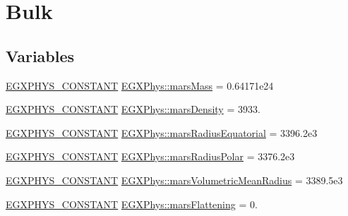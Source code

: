 \hypertarget{group___e_g_x_phys-_constants-_astrophysics-_solar_system-_mars-_bulk}{}\section{Bulk}
\label{group___e_g_x_phys-_constants-_astrophysics-_solar_system-_mars-_bulk}
\subsection*{Variables}
\begin{DoxyCompactItemize}
\item 
\mbox{\hyperlink{group___e_g_x_phys-_constants-_macros_ga76980d288494ce1714c9ac68a95ba702}{E\+G\+X\+P\+H\+Y\+S\+\_\+\+C\+O\+N\+S\+T\+A\+NT}} \mbox{\hyperlink{group___e_g_x_phys-_constants-_astrophysics-_solar_system-_mars-_bulk_gacbdde45535f9e28a8a5d027480c9c6c8}{E\+G\+X\+Phys\+::mars\+Mass}} = 0.\+64171e24
\item 
\mbox{\hyperlink{group___e_g_x_phys-_constants-_macros_ga76980d288494ce1714c9ac68a95ba702}{E\+G\+X\+P\+H\+Y\+S\+\_\+\+C\+O\+N\+S\+T\+A\+NT}} \mbox{\hyperlink{group___e_g_x_phys-_constants-_astrophysics-_solar_system-_mars-_bulk_ga6871edfd0369c53e4d01b0cef426f095}{E\+G\+X\+Phys\+::mars\+Density}} = 3933.
\item 
\mbox{\hyperlink{group___e_g_x_phys-_constants-_macros_ga76980d288494ce1714c9ac68a95ba702}{E\+G\+X\+P\+H\+Y\+S\+\_\+\+C\+O\+N\+S\+T\+A\+NT}} \mbox{\hyperlink{group___e_g_x_phys-_constants-_astrophysics-_solar_system-_mars-_bulk_gad164808b78372ba39b4e1db1daa53a61}{E\+G\+X\+Phys\+::mars\+Radius\+Equatorial}} = 3396.\+2e3
\item 
\mbox{\hyperlink{group___e_g_x_phys-_constants-_macros_ga76980d288494ce1714c9ac68a95ba702}{E\+G\+X\+P\+H\+Y\+S\+\_\+\+C\+O\+N\+S\+T\+A\+NT}} \mbox{\hyperlink{group___e_g_x_phys-_constants-_astrophysics-_solar_system-_mars-_bulk_ga9babf4f526022d2bcd3d434453401ff5}{E\+G\+X\+Phys\+::mars\+Radius\+Polar}} = 3376.\+2e3
\item 
\mbox{\hyperlink{group___e_g_x_phys-_constants-_macros_ga76980d288494ce1714c9ac68a95ba702}{E\+G\+X\+P\+H\+Y\+S\+\_\+\+C\+O\+N\+S\+T\+A\+NT}} \mbox{\hyperlink{group___e_g_x_phys-_constants-_astrophysics-_solar_system-_mars-_bulk_ga89463b1a65363c3f458c8427a3d5ca90}{E\+G\+X\+Phys\+::mars\+Volumetric\+Mean\+Radius}} = 3389.\+5e3
\item 
\mbox{\hyperlink{group___e_g_x_phys-_constants-_macros_ga76980d288494ce1714c9ac68a95ba702}{E\+G\+X\+P\+H\+Y\+S\+\_\+\+C\+O\+N\+S\+T\+A\+NT}} \mbox{\hyperlink{group___e_g_x_phys-_constants-_astrophysics-_solar_system-_mars-_bulk_ga4964bcdb2b94b7df3e3f5c251dfc6501}{E\+G\+X\+Phys\+::mars\+Flattening}} = 0.

\end{DoxyCompactItemize}
